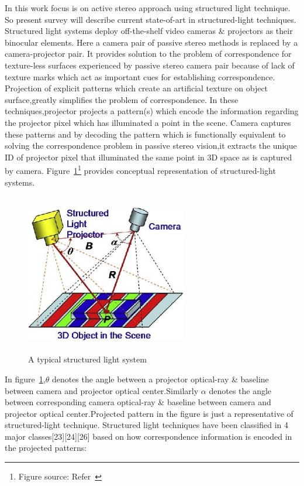 In this work focus is on active stereo approach using structured light technique. So present survey will describe current state-of-art in structured-light techniques. Structured light systems deploy off-the-shelf video cameras \& projectors as their binocular elements. Here a camera pair of passive stereo methods is replaced by a camera-projector pair. It provides solution to the problem of correspondence for texture-less surfaces experienced by passive stereo camera pair because of lack of texture marks which act as important cues for establishing correspondence. Projection of explicit patterns which create an artificial texture on object surface,greatly simplifies the problem of correspondence. In these techniques,projector projects a pattern(s) which encode the information regarding the projector pixel which has illuminated a point in the scene. Camera captures these patterns and by decoding the pattern which is functionally equivalent to solving the correspondence problem in passive stereo vision,it extracts the unique ID of projector pixel that illuminated the same point in 3D space as is captured by camera. Figure~\ref{fig:sls}\footnote{Figure source: Refer~\cite{25}} provides conceptual representation of structured-light systems.\newline

\begin{figure}[hb]
\centering
\includegraphics[width=7cm,height=7cm]{../img_source/struct_light.jpg}
\caption{A typical structured light system}
\label{fig:sls}
\end{figure}

\noindent
In figure~\ref{fig:sls},$\theta$  denotes the angle between a projector optical-ray \& baseline between camera and projector optical center.Similarly $\alpha$ denotes the angle between corresponding camera optical-ray \& baseline between camera and projector optical center.Projected pattern in the figure is just a representative of structured-light technique.\newline
\noindent
Structured light techniques have been classified in 4 major classes[23][24][26] based on how correspondence information is encoded in the projected patterns:
